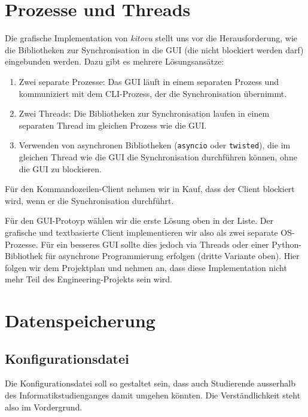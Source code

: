 \documentclass[a4paper]{article}
\let\oldsection\section
\renewcommand\section{\clearpage\oldsection}
\begin{document}
\section{Prozesse und Threads}


Die grafische Implementation von \emph{kitovu} stellt uns vor die Herausforderung, wie die Bibliotheken zur Synchronisation in die GUI (die nicht blockiert werden darf) eingebunden werden. Dazu gibt es mehrere Lösungsansätze:

\begin{enumerate}
	\item Zwei separate Prozesse: Das GUI läuft in einem separaten Prozess und kommuniziert mit dem CLI-Prozess, der die Synchronisation übernimmt.
	\item Zwei Threads: Die Bibliotheken zur Synchronisation laufen in einem separaten Thread im gleichen Prozess wie die GUI.
	\item Verwenden von asynchronen Bibliotheken (\verb|asyncio| oder \verb|twisted|), die im gleichen Thread wie die GUI die Synchronisation durchführen können, ohne die GUI zu blockieren.
\end{enumerate}

Für den Kommandozeilen-Client nehmen wir in Kauf, dass der Client blockiert wird, wenn er die Synchronisation durchführt.

Für den GUI-Protoyp wählen wir die erste Lösung oben in der Liste. Der grafische und textbasierte Client implementieren wir also als zwei separate OS-Prozesse. Für ein besseres GUI sollte dies jedoch via Threads oder einer Python-Bibliothek für asynchrone Programmierung erfolgen (dritte Variante oben). Hier folgen wir dem Projektplan und nehmen an, dass diese Implementation nicht mehr Teil des Engineering-Projekts sein wird.

\section{Datenspeicherung}

\subsection{Konfigurationsdatei}
Die Konfigurationsdatei soll so gestaltet sein, dass auch Studierende ausserhalb des Informatikstudienganges damit umgehen könnten. Die Verständlichkeit steht also im Vordergrund. 
\end{document}
